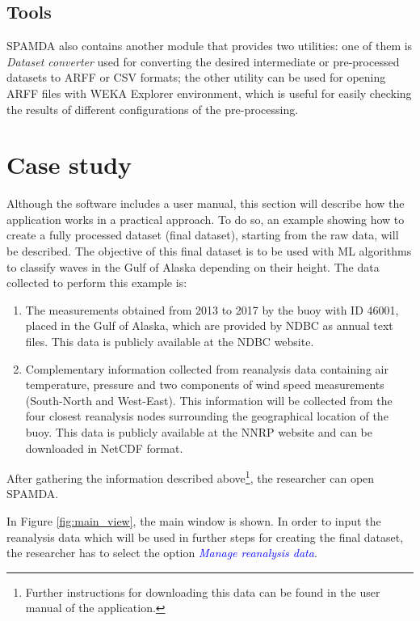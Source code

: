 \documentclass[review]{elsarticle}
\begin{document}
			\subsection{Tools}
			
				SPAMDA also contains another module that provides two utilities: one of them is \textit{Dataset converter} used for converting the desired intermediate or pre-processed datasets to ARFF or CSV formats; the other utility can be used for opening ARFF files with WEKA Explorer environment, which is useful for easily checking the results of different configurations of the pre-processing.
				
	\section{Case study}\label{sec:CaseStudy}
			
		Although the software includes a user manual, this section will describe how the application works in a practical approach. To do so, an example showing how to create a fully processed dataset (final dataset), starting from the raw data, will be described. The objective of this final dataset is to be used with ML algorithms to classify waves in the Gulf of Alaska depending on their height. The data collected to perform this example is:
		\begin{enumerate}
		\item The measurements obtained from 2013 to 2017 by the buoy with ID 46001, placed in the Gulf of Alaska, which are provided by NDBC as annual text files. This data is publicly available at the NDBC website. 
		\item Complementary information collected from reanalysis data containing air temperature, pressure and two components of wind speed measurements (South-North and West-East). This information will be collected from the four closest reanalysis nodes surrounding the geographical location of the buoy. This data is publicly available at the NNRP website and can be downloaded in NetCDF format.
		\end{enumerate}
		
		After gathering the information described above\footnote{Further instructions for downloading this data can be found in the user manual of the application.}, the researcher can open SPAMDA.
		
		In Figure \ref{fig:main_view}, the main window is shown. In order to input the reanalysis data which will be used in further steps for creating the final dataset, the researcher has to select the option \textcolor{blue}{\textit{Manage reanalysis data}}.
		
\end{document}
